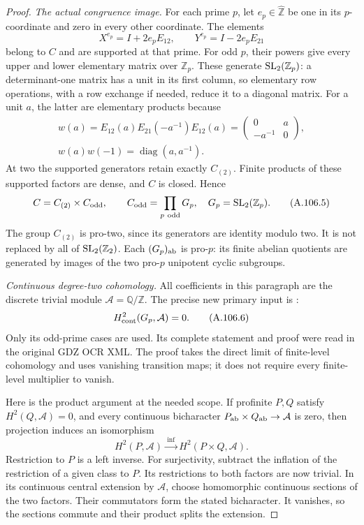 \begin{proof}
\emph{The actual congruence image.}
For each prime \(p\), let \(e_p\in\widehat{\mathbb Z}\) be one in
its \(p\)-coordinate and zero in every other coordinate. The elements
\[
 X^{e_p}=I+2e_pE_{12},\qquad Y^{e_p}=I-2e_pE_{21}
\]
belong to \(C\) and are supported at that prime. For odd \(p\),
their powers give every upper and lower elementary matrix over
\(\mathbb Z_p\). These generate \({\rm SL}_2(\mathbb Z_p)\):
a determinant-one matrix has a unit in its first column, so
elementary row operations, with a row exchange if needed, reduce it
to a diagonal matrix. For a unit \(a\), the latter are elementary
products because
\[
 \begin{gathered}
 w(a)=E_{12}(a)E_{21}(-a^{-1})E_{12}(a)
      =\begin{pmatrix}0&a\\-a^{-1}&0\end{pmatrix},\\
 w(a)w(-1)=\operatorname{diag}(a,a^{-1}).
 \end{gathered}
\]
At two the supported generators retain exactly \(C_{(2)}\).
Finite products of these supported factors are dense, and \(C\) is
closed. Hence
\[
 C=C_{(2)}\times C_{\rm odd},\qquad
 C_{\rm odd}=\prod_{p\ {\rm odd}}G_p,\quad
 G_p={\rm SL}_2(\mathbb Z_p).
 \tag{A.106.5}
\]
The group \(C_{(2)}\) is pro-two, since its generators are identity
modulo two. It is not replaced by all of
\({\rm SL}_2(\mathbb Z_2)\). Each \((G_p)_{\rm ab}\) is pro-\(p\):
its finite abelian quotients are generated by images of the two
pro-\(p\) unipotent cyclic subgroups.

\emph{Continuous degree-two cohomology.}
All coefficients in this paragraph are the discrete trivial module
\(\mathcal A=\mathbb Q/\mathbb Z\). The precise new primary input is
\cite[Proposition~5.7(b), printed p.~41]{A_Beyl1986}:
\[
 H^2_{\rm cont}(G_p,\mathcal A)=0.
 \tag{A.106.6}
\]
Only its odd-prime cases are used. Its complete statement and proof
were read in the original GDZ OCR XML. The proof takes the direct
limit of finite-level cohomology and uses vanishing transition maps;
it does not require every finite-level multiplier to vanish.

Here is the product argument at the needed scope. If profinite
\(P,Q\) satisfy \(H^2(Q,\mathcal A)=0\), and every continuous
bicharacter \(P_{\rm ab}\times Q_{\rm ab}\to\mathcal A\) is zero,
then projection induces an isomorphism
\[
 H^2(P,\mathcal A)\xrightarrow{\ \mathrm{inf}\ }
                  H^2(P\times Q,\mathcal A).
 \tag{A.106.7}
\]
Restriction to \(P\) is a left inverse. For surjectivity, subtract the
inflation of the restriction of a given class to \(P\). Its
restrictions to both factors are now trivial. In its continuous
central extension by \(\mathcal A\), choose homomorphic continuous
sections of the two factors. Their commutators form the stated
bicharacter. It vanishes, so the sections commute and their product
splits the extension.


\end{proof}
